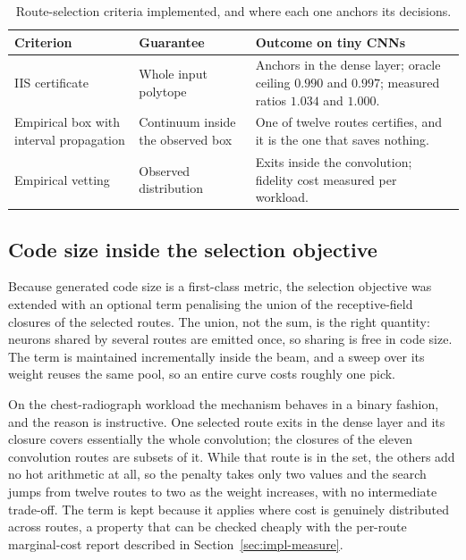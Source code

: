 \begin{table}[H]
	\centering
	\small
	\caption{Route-selection criteria implemented, and where each one anchors its decisions.}
	\label{tab:impl-criteria}
	\begin{tabularx}{\textwidth}{@{}>{\raggedright\arraybackslash}p{}>{\raggedright\arraybackslash}p{}X@{}}
		\toprule
		\textbf{Criterion} & \textbf{Guarantee} & \textbf{Outcome on tiny \acp{CNN}} \\
		\midrule
		\ac{IIS} certificate & Whole input polytope & Anchors in the dense layer; oracle ceiling \(0.990\) and \(0.997\); measured ratios \(1.034\) and \(1.000\). \\
		Empirical box with interval propagation & Continuum inside the observed box & One of twelve routes certifies, and it is the one that saves nothing. \\
		Empirical vetting & Observed distribution & Exits inside the convolution; fidelity cost measured per workload. \\
		\bottomrule
	\end{tabularx}
\end{table}

\subsection{Code size inside the selection objective}

Because generated code size is a first-class metric, the selection objective was extended with an optional term penalising the union of the receptive-field closures of the selected routes.
The union, not the sum, is the right quantity: neurons shared by several routes are emitted once, so sharing is free in code size.
The term is maintained incrementally inside the beam, and a sweep over its weight reuses the same pool, so an entire curve costs roughly one pick.

On the chest-radiograph workload the mechanism behaves in a binary fashion, and the reason is instructive.
One selected route exits in the dense layer and its closure covers essentially the whole convolution; the closures of the eleven convolution routes are subsets of it.
While that route is in the set, the others add no hot arithmetic at all, so the penalty takes only two values and the search jumps from twelve routes to two as the weight increases, with no intermediate trade-off.
The term is kept because it applies where cost is genuinely distributed across routes, a property that can be checked cheaply with the per-route marginal-cost report described in Section~\ref{sec:impl-measure}.


